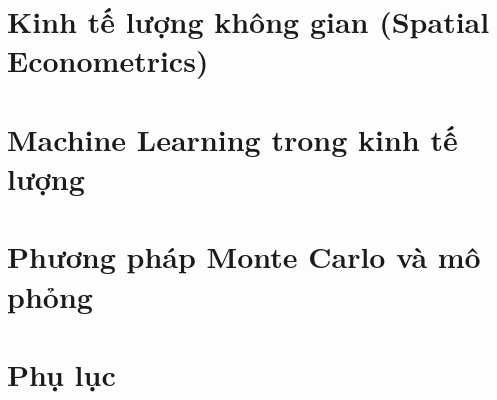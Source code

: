\documentclass[openany]{book}
\begin{document}
\part{Kinh tế lượng không gian (Spatial Econometrics)}







\part{Machine Learning trong kinh tế lượng}







\part{Phương pháp Monte Carlo và mô phỏng}





\appendix
\part{Phụ lục}


\cleardoublepage
{} %


\end{document}
